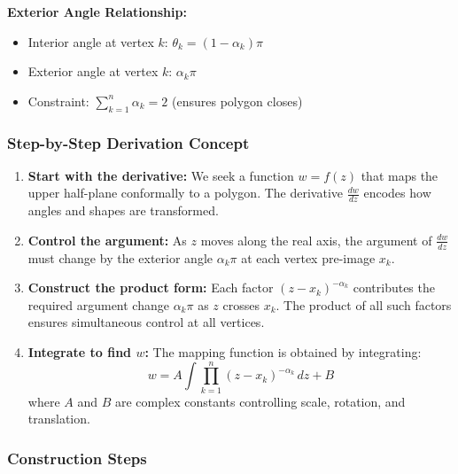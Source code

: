\documentclass[12pt,a4paper]{article}
\begin{document}
\begin{theorembox}
\textbf{Exterior Angle Relationship:}
\begin{itemize}
\item Interior angle at vertex \(k\): \(\theta_k = (1 - \alpha_k)\pi\)
\item Exterior angle at vertex \(k\): \(\alpha_k \pi\)
\item Constraint: \(\sum_{k=1}^{n} \alpha_k = 2\) (ensures polygon closes)
\end{itemize}
\end{theorembox}



\subsubsection{Step-by-Step Derivation
Concept}\label{step-by-step-derivation-concept}

\begin{enumerate}
\def\labelenumi{\arabic{enumi}.}
\item
  \textbf{Start with the derivative:} We seek a function \(w = f(z)\) that maps the upper half-plane conformally to a polygon. The derivative \(\frac{dw}{dz}\) encodes how angles and shapes are transformed.

\item
  \textbf{Control the argument:} As \(z\) moves along the real axis, the argument of \(\frac{dw}{dz}\) must change by the exterior angle \(\alpha_k \pi\) at each vertex pre-image \(x_k\).

\item
  \textbf{Construct the product form:} Each factor \((z - x_k)^{-\alpha_k}\) contributes the required argument change \(\alpha_k \pi\) as \(z\) crosses \(x_k\). The product of all such factors ensures simultaneous control at all vertices.

\item
  \textbf{Integrate to find \(w\):} The mapping function is obtained by integrating:
  \[
  w = A \int \prod_{k=1}^{n} (z - x_k)^{-\alpha_k} \, dz + B
  \]
  where \(A\) and \(B\) are complex constants controlling scale, rotation, and translation.
\end{enumerate}

\subsubsection{Construction Steps}\label{construction-steps}
\end{document}
